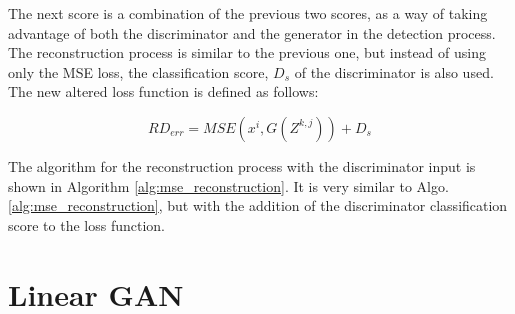 The next score is a combination of the previous two scores, as a way of taking advantage of both the discriminator and the generator in the detection process. The reconstruction process is similar to the previous one, but instead of using only the MSE loss, the classification score, $D_{s}$ of the discriminator is also used. The new altered loss function is defined as follows:

\begin{equation}
    RD_{err} = MSE(x^i, G(Z^{k,j})) + D_{s}
\end{equation}

The algorithm for the reconstruction process with the discriminator input is shown in Algorithm \ref{alg:mse_reconstruction}. It is very similar to Algo. \ref{alg:mse_reconstruction}, but with the addition of the discriminator classification score to the loss function.
\\

\noindent{}

\section{Linear GAN}\label{sec:gan_experiment_1}

